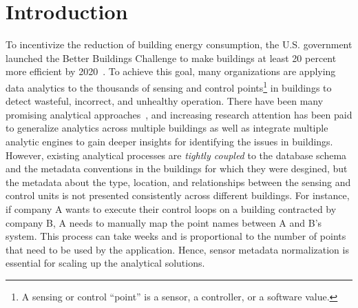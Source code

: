 \section{Introduction}

To incentivize the reduction of building energy consumption, the U.S. government
launched the Better Buildings Challenge to make buildings at least 20 percent
more efficient by 2020~\cite{doe2013better}. To achieve this goal, many organizations
are applying data analytics to the thousands of sensing and control points\footnote{A sensing or control ``point'' is a sensor, a controller, or a software value.} in
buildings to detect wasteful, incorrect, and unhealthy operation.
There have been many promising analytical approaches~\cite{}, and increasing research attention has been paid to generalize
analytics across multiple buildings as well as integrate multiple analytic engines to gain deeper insights
for identifying the issues in buildings.
However, existing analytical processes are \emph{tightly coupled} to the database schema and the metadata conventions in the buildings for which they were desgined, but the metadata about the type, location, and relationships between the sensing
and control units is not presented consistently across different buildings.
For instance, if company A wants to execute their
control loops on a building contracted by company B, A needs to manually
map the point names between A and B's system. This process can take weeks and is proportional
to the number of points that need to be used by the application.
Hence, sensor metadata normalization is essential for scaling up the analytical solutions.

